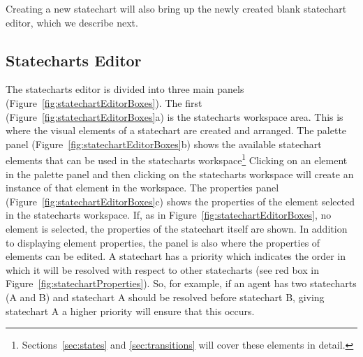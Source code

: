 \documentclass[11pt]{amsart}
\begin{document}
Creating a new statechart will also bring up the newly created blank statechart editor, which we describe next.





\clearpage

\subsection{Statecharts Editor}

The statecharts editor is divided into three main panels (Figure~\ref{fig:statechartEditorBoxes}). The first (Figure~\ref{fig:statechartEditorBoxes}a) is the statecharts workspace area. This is where the visual elements of a statechart are created and arranged. The palette panel (Figure~\ref{fig:statechartEditorBoxes}b) shows the available statechart elements that can be used in the statecharts workspace\footnote{Sections~\ref{sec:states} and \ref{sec:transitions} will cover these elements in detail.} Clicking on an element in the palette panel and then clicking on the statecharts workspace will create an instance of that element in the workspace. The properties panel (Figure~\ref{fig:statechartEditorBoxes}c) shows the properties of the element selected in the statecharts workspace. If, as in Figure~\ref{fig:statechartEditorBoxes}, no element is selected, the properties of the statechart itself are shown. In addition to displaying element properties, the panel is also where the properties of elements can be edited. A statechart has a priority which indicates the order in which it will be resolved with respect to other statecharts (see red box in Figure~\ref{fig:statechartProperties}). So, for example, if an agent has two statecharts (A and B) and statechart A should be resolved before statechart B, giving statechart A a higher priority will ensure that this occurs.
\end{document}
